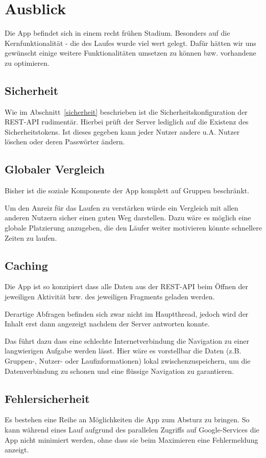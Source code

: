 \section{Ausblick}\label{ausblick}
Die App befindet sich in einem recht frühen Stadium. Besonders auf die Kernfunktionalität - die des Laufes wurde viel wert gelegt. Dafür hätten wir uns gewünscht einige weitere Funktionalitäten umsetzen zu können bzw. vorhandene zu optimieren. 
\subsection{Sicherheit}
Wie im Abschnitt~\ref{sicherheit} beschrieben ist die Sicherheitskonfiguration der REST-API rudimentär. Hierbei prüft der Server lediglich auf die Existenz des Sicherheitstokens. Ist dieses gegeben kann jeder Nutzer andere u.A. Nutzer löschen oder deren Passwörter ändern.

\subsection{Globaler Vergleich}
Bisher ist die soziale Komponente der App komplett auf Gruppen beschränkt.

Um den Anreiz für das Laufen zu verstärken würde ein Vergleich mit allen anderen Nutzern sicher einen guten Weg darstellen. Dazu wäre es möglich eine globale Platzierung anzugeben, die den Läufer weiter motivieren könnte schnellere Zeiten zu laufen.

\subsection{Caching}
Die App ist so konzipiert dass alle Daten aus der REST-API beim Öffnen der jeweiligen Aktivität bzw. des jeweiligen Fragments geladen werden. 

Derartige Abfragen befinden sich zwar nicht im Hauptthread, jedoch wird der Inhalt erst dann angezeigt nachdem der Server antworten konnte.

Das führt dazu dass eine schlechte Internetverbindung die Navigation zu einer langwierigen Aufgabe werden lässt. Hier wäre es vorstellbar die Daten (z.B. Gruppen-, Nutzer- oder Laufinformationen) lokal zwischenzuspeichern, um die Datenverbindung zu schonen und eine flüssige Navigation zu garantieren.

\subsection{Fehlersicherheit}
Es bestehen eine Reihe an Möglichkeiten die App zum Absturz zu bringen. So kann während eines Lauf aufgrund des parallelen Zugriffs auf Google-Services die App nicht minimiert werden, ohne dass sie beim Maximieren eine Fehlermeldung anzeigt.

